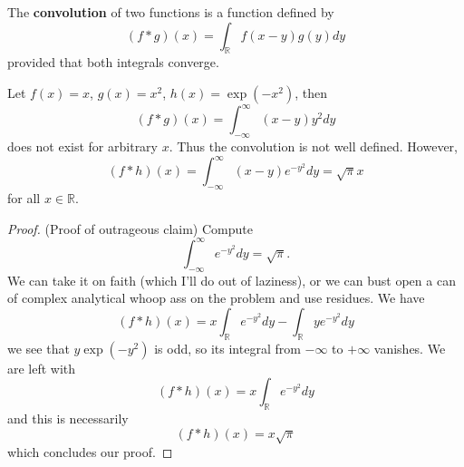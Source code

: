 \begin{defn}
The \textbf{convolution} of two functions is a function
defined by
\begin{equation}
(f*g)(x) = \int_{\mathbb{R}}f(x-y)g(y)dy
\end{equation}
provided that both integrals converge.
\end{defn}

\begin{ex}
Let $f(x)=x$, $g(x)=x^2$, $h(x)=\exp(-x^2)$, then
\begin{equation}
(f*g)(x) = \int^{\infty}_{-\infty}(x-y)y^2dy
\end{equation}
does not exist for arbitrary $x$. Thus the convolution is
not well defined. However,
\begin{equation}
(f*h)(x) = \int^{\infty}_{-\infty}(x-y)e^{-y^2}dy =
  \sqrt{\pi}x
\end{equation}
for all $x\in\mathbb{R}$.
\end{ex}
\begin{proof}{(Proof of outrageous claim)}
Compute
\begin{equation}
\int^{\infty}_{-\infty}e^{-y^2}dy = \sqrt{\pi}.
\end{equation}
We can take it on faith (which I'll do out of laziness), or
we can bust open a can of complex analytical whoop ass on
the problem and use residues. We have
\begin{equation}
(f*h)(x)=x\int_{\mathbb{R}}e^{-y^{2}}dy - \int_{\mathbb{R}}ye^{-y^2}dy
\end{equation}
we see that $y\exp(-y^2)$ is odd, so its integral from
$-\infty$ to $+\infty$ vanishes. We are left with
\begin{equation}
(f*h)(x)=x\int_{\mathbb{R}}e^{-y^2}dy
\end{equation}
and this is necessarily
\begin{equation}
(f*h)(x) = x\sqrt{\pi}
\end{equation}
which concludes our proof.
\end{proof}


